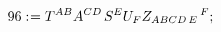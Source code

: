 \documentclass[11pt]{article}
\def\specialcolon{\mathrel{\mathop{:}}\hspace{-.5em}}
\begin{document}
\begin{dmath*}[compact, spread=2pt]
96\specialcolon{}= {T}^{A B} {A}^{C D\, } {S}^{E} {U}_{F} {Z}_{A B C D\,  E}\,^{F};
\end{dmath*}
\end{document}
